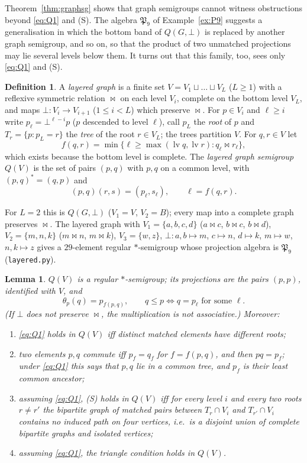 \documentclass[11pt]{amsart}
\newtheorem{lemma}[theorem]{Lemma}
\theoremstyle{definition}
\newtheorem{definition}[theorem]{Definition}
\newcommand{\mt}{\bowtie}   %
\begin{document}
Theorem~\ref{thm:graphsg} shows that graph semigroups cannot witness obstructions beyond \eqref{eq:Q1} and (S). The algebra $\mathfrak P_9$ of Example~\ref{ex:P9} suggests a generalisation in which the bottom band of $Q(G,\bot)$ is replaced by another graph semigroup, and so on, so that the product of two unmatched projections may lie several levels below them. It turns out that this family, too, sees only \eqref{eq:Q1} and (S).

\begin{definition}\label{def:layered}
A \emph{layered graph} is a finite set $V=V_1\sqcup\dots\sqcup V_L$ ($L\ge1$) with a reflexive symmetric relation $\mt$ on each level $V_i$, complete on the bottom level $V_L$, and maps $\bot\colon V_i\to V_{i+1}$ ($1\le i<L$) which preserve $\mt$. For $p\in V_i$ and $\ell\ge i$ write $p_\ell=\bot^{\ell-i}p$ ($p$ descended to level $\ell$), call $p_L$ the \emph{root} of $p$ and $T_r=\{p:p_L=r\}$ the \emph{tree} of the root $r\in V_L$; the trees partition $V$. For $q,r\in V$ let
\[
f(q,r)=\min\{\ell\ge\max(\operatorname{lv}q,\operatorname{lv}r): q_\ell\mt r_\ell\},
\]
which exists because the bottom level is complete. The \emph{layered graph semigroup} $Q(V)$ is the set of pairs $(p,q)$ with $p,q$ on a common level, with $(p,q)^*=(q,p)$ and
\[
(p,q)(r,s)=(p_\ell,s_\ell),\qquad \ell=f(q,r).
\]
\end{definition}

For $L=2$ this is $Q(G,\bot)$ ($V_1=V$, $V_2=B$); every map into a complete graph preserves $\mt$. The layered graph with $V_1=\{a,b,c,d\}$ ($a\mt c$, $b\mt c$, $b\mt d$), $V_2=\{m,n,k\}$ ($m\mt n$, $m\mt k$), $V_3=\{w,z\}$, $\bot\colon a,b\mapsto m$, $c\mapsto n$, $d\mapsto k$, $m\mapsto w$, $n,k\mapsto z$ gives a $29$-element regular $*$-semigroup whose projection algebra is $\mathfrak P_9$ (\texttt{layered.py}).

\begin{lemma}\label{lem:layered}
$Q(V)$ is a regular $*$-semigroup; its projections are the pairs $(p,p)$, identified with $V$, and
\[
\theta_p(q)=p_{f(p,q)},\qquad q\le p\iff q=p_\ell\text{ for some }\ell .
\]
(If $\bot$ does not preserve $\mt$, the multiplication is not associative.) Moreover:
\begin{enumerate}[label=\textup{(\alph*)},nosep]
\item \eqref{eq:Q1} holds in $Q(V)$ iff distinct matched elements have different roots;
\item two elements $p,q$ commute iff $p_f=q_f$ for $f=f(p,q)$, and then $pq=p_f$; under \eqref{eq:Q1} this says that $p,q$ lie in a common tree, and $p_f$ is their least common ancestor;
\item assuming \eqref{eq:Q1}, (S) holds in $Q(V)$ iff for every level $i$ and every two roots $r\ne r'$ the bipartite graph of matched pairs between $T_r\cap V_i$ and $T_{r'}\cap V_i$ contains no induced path on four vertices, i.e.\ is a disjoint union of complete bipartite graphs and isolated vertices;
\item assuming \eqref{eq:Q1}, the triangle condition holds in $Q(V)$.
\end{enumerate}
\end{lemma}
\end{document}
